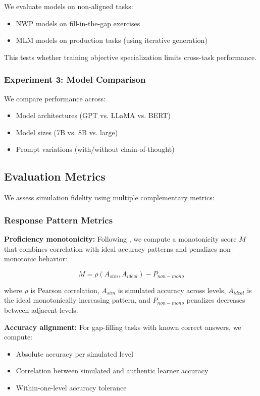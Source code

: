 We evaluate models on non-aligned tasks:
\begin{itemize}
    \item NWP models on fill-in-the-gap exercises
    \item MLM models on production tasks (using iterative generation)
\end{itemize}

This tests whether training objective specialization limits cross-task performance.

\subsubsection{Experiment 3: Model Comparison}

We compare performance across:
\begin{itemize}
    \item Model architectures (GPT vs. LLaMA vs. BERT)
    \item Model sizes (7B vs. 8B vs. large)
    \item Prompt variations (with/without chain-of-thought)
\end{itemize}

\subsection{Evaluation Metrics}

We assess simulation fidelity using multiple complementary metrics:

\subsubsection{Response Pattern Metrics}

\textbf{Proficiency monotonicity:} Following \citet{benedetto2024using}, we compute a monotonicity score $M$ that combines correlation with ideal accuracy patterns and penalizes non-monotonic behavior:

\[M = \rho(A_{sim}, A_{ideal}) - P_{non-mono}\]

where $\rho$ is Pearson correlation, $A_{sim}$ is simulated accuracy across levels, $A_{ideal}$ is the ideal monotonically increasing pattern, and $P_{non-mono}$ penalizes decreases between adjacent levels.

\textbf{Accuracy alignment:} For gap-filling tasks with known correct answers, we compute:
\begin{itemize}
    \item Absolute accuracy per simulated level
    \item Correlation between simulated and authentic learner accuracy
    \item Within-one-level accuracy tolerance
\end{itemize}

